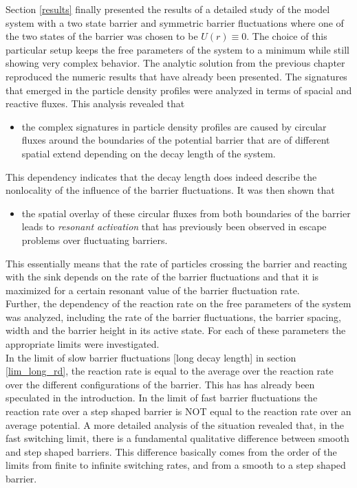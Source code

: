 Section \ref{results} finally presented the results of a detailed study of the model system with a two state barrier and symmetric barrier fluctuations where one of the two states of the barrier was chosen to be $U(r) \equiv 0$. The choice of this particular setup keeps the free parameters of the system to a minimum while still showing very complex behavior.
The analytic solution from the previous chapter reproduced the numeric results that have already been presented.  The signatures that emerged in the particle density profiles were analyzed in terms of spacial and reactive fluxes. This analysis revealed that 
\begin{itemize}
    \item the complex signatures in particle density profiles are caused by circular fluxes around the boundaries of the potential barrier that are of different spatial extend depending on the decay length of the system. 
\end{itemize}
This dependency indicates that the decay length does indeed describe the nonlocality of the influence of the barrier fluctuations. It was then shown that
\begin{itemize}
    \item the spatial overlay of these circular fluxes from both boundaries of the barrier leads to \emph{resonant activation} that has previously been observed in escape problems over fluctuating barriers.
\end{itemize}
This essentially means that the rate of particles crossing the barrier and reacting with the sink depends on the rate of the barrier fluctuations and that it is maximized for a certain resonant value of the barrier fluctuation rate. \\
Further, the dependency of the reaction rate on the free parameters of the system was analyzed, including the rate of the barrier fluctuations, the barrier spacing, width and the barrier height in its active state. For each of these parameters the appropriate limits were investigated. \\
In the limit of slow barrier fluctuations [long decay length] in section \ref{lim_long_rd}, the reaction rate is equal to the average over the reaction rate over the different configurations of the barrier. This has has already been speculated in the introduction. In the limit of fast barrier fluctuations the reaction rate over a step shaped barrier is NOT equal to the reaction rate over an average potential. 
A more detailed analysis of the situation revealed that, in the fast switching limit, there is a fundamental qualitative difference between smooth and step shaped barriers. This difference basically comes from the order of the limits from finite to infinite switching rates, and from a smooth to a step shaped barrier.
